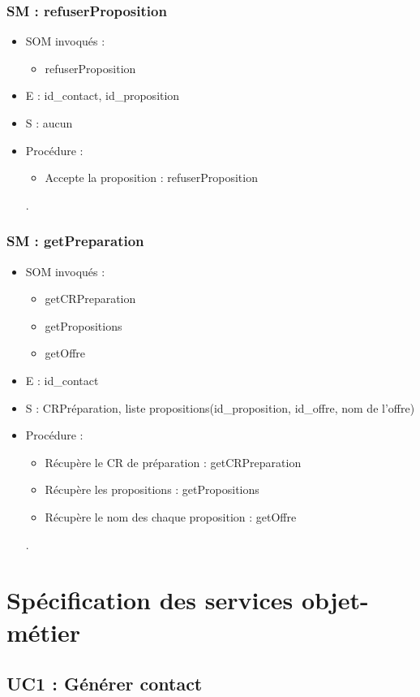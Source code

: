 \subsubsection{SM : refuserProposition}
\begin{itemize}
\item SOM invoqués :
\begin{itemize}
\item refuserProposition
\end{itemize}
\item E : id\_contact, id\_proposition
\item S : aucun
\item Procédure :
\begin{itemize}
\item Accepte la proposition : refuserProposition
\end{itemize}.
\end{itemize}
\subsubsection{SM : getPreparation}
\begin{itemize}
\item SOM invoqués :
\begin{itemize}
\item getCRPreparation
\item getPropositions
\item getOffre
\end{itemize}
\item E : id\_contact
\item S : CRPréparation, liste propositions(id\_proposition, id\_offre, nom de l’offre)
\item Procédure :
\begin{itemize}
\item Récupère le CR de préparation : getCRPreparation
\item Récupère les propositions : getPropositions
\item Récupère le nom des chaque proposition : getOffre
\end{itemize}.
\end{itemize}
\section{Spécification des services objet-métier}
\subsection{UC1 : Générer contact}
